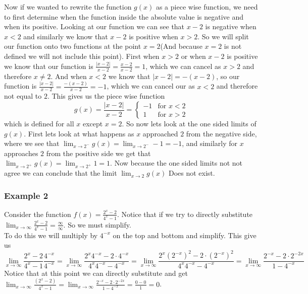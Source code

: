 \documentclass[12pt]{article}
\begin{document}
Now if we wanted to rewrite the function $g(x)$ as a piece wise function, we need to first determine when the function inside the absolute value is negative and when its positive. Looking at our function we can see that $x-2$ is negative when $x<2$ and similarly we know that $x-2$ is positive when $x>2$. So we will split our function onto two functions at the point $x=2$(And because $x=2$ is not defined we will not include this point). First when $x> 2$ or when $x-2$ is positive we know that our function is $\frac{|x-2|}{x-2}=\frac{x-2}{x-2}=1$, which we can cancel as $x>2$ and therefore $x\neq 2$. And when $x<2$ we know that $|x-2|= -(x-2)$, so our function is $\frac{|x-2|}{x-2}=\frac{-(x-2)}{x-2}=-1$, which we can cancel our as $x<2$ and therefore not equal to $2$. This gives us the piece wise function 
$$g(x)=\frac{|x-2|}{x-2}=\begin{cases}
        -1 & \text{for } x < 2\\
        1 & \text{for } x > 2  
    \end{cases}$$
which is defined for all $x$ except $x=2$. So now lets look at the one sided limits of $g(x)$. First lets look at what happens as $x$ approached $2$ from the negative side, where we see that $\displaystyle{\lim_{x\to 2^{-}}g(x)}=\displaystyle{\lim_{x\to 2^{-}}-1}=-1$, and similarly for $x$ approaches $2$ from the positive side we get that $\displaystyle{\lim_{x\to 2^{+}}g(x)}=\displaystyle{\lim_{x\to 2^{+}}1}=1$. Now because the one sided limits not not agree we can conclude that the limit $\displaystyle{\lim_{x\to 2}g(x)}$ Does not exist.



\subsubsection{Example 2}
\label{ex:exp2}

Consider the function $f(x)=\frac{2^{x}-2}{4^{x}-1}$. Notice that if we try to directly substitute $\displaystyle{\lim_{x\to\infty}\frac{2^{x}-2}{4^{x}-1}}=\frac{\infty}{\infty}$. So we must simplify.\\

To do this we will multiply by $4^{-x}$ on the top and bottom and simplify. This give us
$$\displaystyle{\lim_{x\to\infty}\frac{2^{x}-2}{4^{x}-1}}\frac{4^{-x}}{4^{-x}}=\lim_{x\to\infty}\frac{2^{x}4^{-x}-2\cdot4^{-x}}{4^{x}4^{-x}-4^{-x}}=\lim_{x\to\infty}\frac{2^{x}\left(2^{-x}\right)^{2}-2\cdot\left(2^{-x}\right)^{2}}{4^{x}4^{-x}-4^{-x}}=\lim_{x\to\infty}\frac{2^{-x}-2\cdot2^{-2x}}{1-4^{-x}}$$
Notice that at this point we can directly substitute and get
$\displaystyle{\lim_{x\to\infty}\frac{\left(2^{x}-2\right)}{4^{x}-1}}=\lim_{x\to\infty}\frac{2^{-x}-2\cdot2^{-2x}}{1-4^{-x}}=\frac{0-0}{1}=0$.\\
\end{document}
